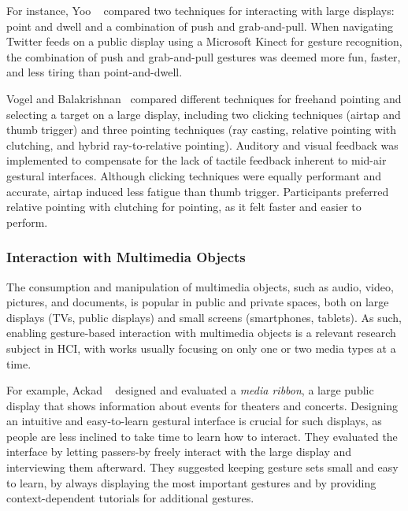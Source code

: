 For instance, Yoo \etal~\cite{Yoo:2015} compared two techniques for interacting with large displays: point and dwell and a combination of push and grab-and-pull. When navigating Twitter feeds on a public display using a Microsoft Kinect for gesture recognition, the combination of push and grab-and-pull gestures was deemed more fun, faster, and less tiring than point-and-dwell.

Vogel and Balakrishnan~\cite{Vogel:2005} compared different techniques for freehand pointing and selecting a target on a large display, including two clicking techniques (airtap and thumb trigger) and three pointing techniques (ray casting, relative pointing with clutching, and hybrid ray-to-relative pointing). Auditory and visual feedback was implemented to compensate for the lack of tactile feedback inherent to mid-air gestural interfaces. Although clicking techniques were equally performant and accurate, airtap induced less fatigue than thumb trigger. Participants preferred relative pointing with clutching for pointing, as it felt faster and easier to perform.


\subsubsection{Interaction with Multimedia Objects}
The consumption and manipulation of multimedia objects, such as audio, video, pictures, and documents, is popular in public and private spaces, both on large displays (\eg TVs, public displays) and small screens (\eg smartphones, tablets). 
%
As such, enabling gesture-based interaction with multimedia objects is a relevant research subject in HCI, with works usually focusing on only one or two media types at a time.

For example, Ackad \etal~\cite{Ackad:2015} designed and evaluated a \textit{media ribbon}, a large public display that shows information about events for theaters and concerts. Designing an intuitive and easy-to-learn gestural interface is crucial for such displays, as people are less inclined to take time to learn how to interact. They evaluated the interface by letting passers-by freely interact with the large display and interviewing them afterward. They suggested keeping gesture sets small and easy to learn, \eg by always displaying the most important gestures and by providing context-dependent tutorials for additional gestures.

